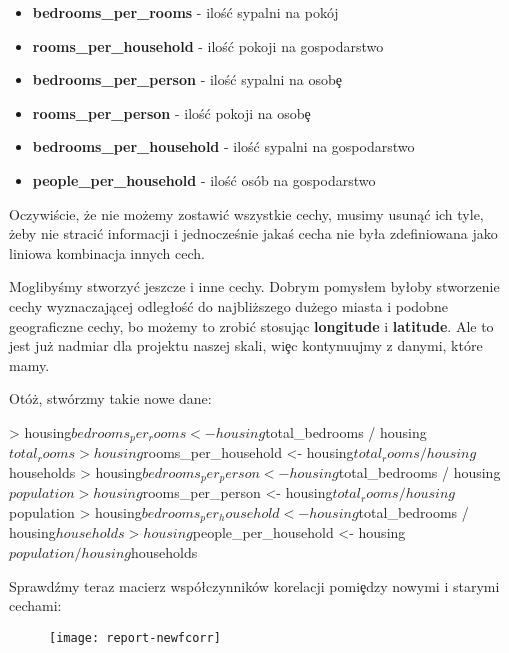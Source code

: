 \documentclass{article}
\begin{document}
\begin{itemize}
  \item \textbf{bedrooms\_per\_rooms} - iloś\'c sypalni na pokój
  \item \textbf{rooms\_per\_household} - iloś\'c pokoji na gospodarstwo
  \item \textbf{bedrooms\_per\_person} - iloś\'c sypalni na osob\c e
  \item \textbf{rooms\_per\_person} - iloś\'c pokoji na osob\c e
  \item \textbf{bedrooms\_per\_household} - iloś\'c sypalni na gospodarstwo
  \item \textbf{people\_per\_household} - iloś\'c osób na gospodarstwo
\end{itemize}

\noindent
\quad Oczywiście, że nie możemy zostawi\'c wszystkie cechy, musimy usuną\'c ich tyle, żeby nie straci\'c informacji i jednocześnie jakaś cecha nie by\l a zdefiniowana jako liniowa kombinacja innych cech.

\noindent
\quad Moglibyśmy stworzy\'c jeszcze i inne cechy. Dobrym pomys\l em by\l oby stworzenie cechy wyznaczającej odleg\l oś\'c do najbliższego dużego miasta i podobne geograficzne cechy, bo możemy to zrobi\'c stosując \textbf{longitude} i \textbf{latitude}. Ale to jest już nadmiar dla projektu naszej skali, wi\c ec kontynuujmy z danymi, które mamy.

\noindent
\quad Otóż, stwórzmy takie nowe dane:

\begin{Schunk}
\begin{Sinput}
> housing$bedrooms_per_rooms <- housing$total_bedrooms / housing$total_rooms
> housing$rooms_per_household <- housing$total_rooms / housing$households
> housing$bedrooms_per_person <- housing$total_bedrooms / housing$population
> housing$rooms_per_person <- housing$total_rooms / housing$population
> housing$bedrooms_per_household <- housing$total_bedrooms / housing$households
> housing$people_per_household <- housing$population / housing$households
\end{Sinput}
\end{Schunk}

\newpage
\noindent
\quad Sprawdźmy teraz macierz wspó\l czynników korelacji pomi\c edzy nowymi i starymi cechami:

\begin{figure}[h!]
\centering
\texttt{[image: report-newfcorr]}
\end{figure}
\end{document}
